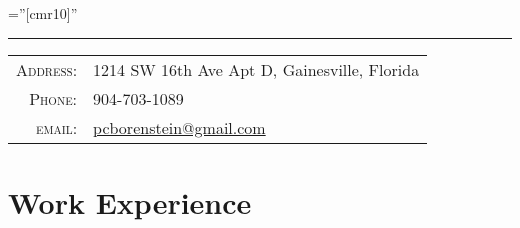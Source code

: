 \documentclass[a4paper,10pt]{article} %
\begin{document}
\pagestyle{empty} %

\font\fb=''[cmr10]'' %


\par{\bigskip\par} %
\noindent\rule{14.3cm}{0.4pt}

\begin{tabular}{rl}
\textsc{Address:} & 1214 SW 16th Ave Apt D, Gainesville, Florida \\
\textsc{Phone:} & 904-703-1089\\
\textsc{email:} & \href{mailto:pcborenstein@gmail.com}{pcborenstein@gmail.com}
\end{tabular}


\section{Work Experience}
\end{document}
